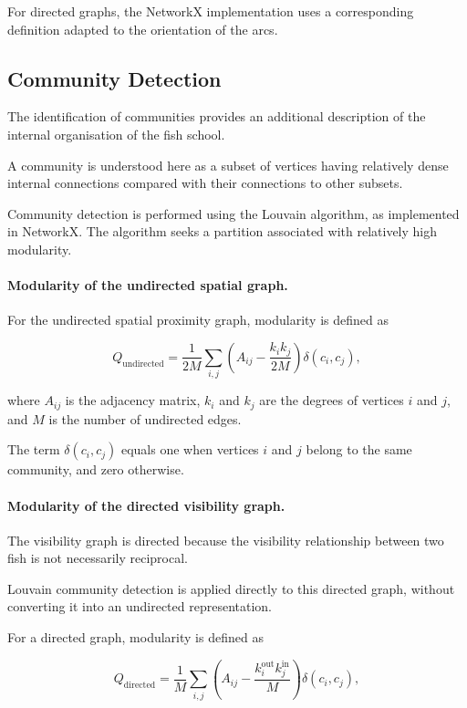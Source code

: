\documentclass[10pt,a4paper]{article}
\begin{document}
For directed graphs, the NetworkX implementation
uses a corresponding definition adapted to the
orientation of the arcs.
\subsection{Community Detection}

The identification of communities provides an
additional description of the internal organisation
of the fish school.

A community is understood here as a subset of
vertices having relatively dense internal connections
compared with their connections to other subsets.

Community detection is performed using the Louvain
algorithm, as implemented in NetworkX. The algorithm
seeks a partition associated with relatively high
modularity.

\paragraph{Modularity of the undirected spatial graph.}

For the undirected spatial proximity graph,
modularity is defined as

\begin{equation}
Q_{\mathrm{undirected}}
=
\frac{1}{2M}
\sum_{i,j}
\left(
A_{ij}
-
\frac{k_i k_j}{2M}
\right)
\delta(c_i,c_j),
\end{equation}

where $A_{ij}$ is the adjacency matrix,
$k_i$ and $k_j$ are the degrees of vertices
$i$ and $j$, and $M$ is the number of
undirected edges.

The term $\delta(c_i,c_j)$ equals one when
vertices $i$ and $j$ belong to the same
community, and zero otherwise.

\paragraph{Modularity of the directed visibility graph.}

The visibility graph is directed because the
visibility relationship between two fish is
not necessarily reciprocal.

Louvain community detection is applied directly
to this directed graph, without converting it
into an undirected representation.

For a directed graph, modularity is defined as

\begin{equation}
Q_{\mathrm{directed}}
=
\frac{1}{M}
\sum_{i,j}
\left(
A_{ij}
-
\frac{k_i^{\mathrm{out}}
     k_j^{\mathrm{in}}}{M}
\right)
\delta(c_i,c_j),
\end{equation}
\end{document}
